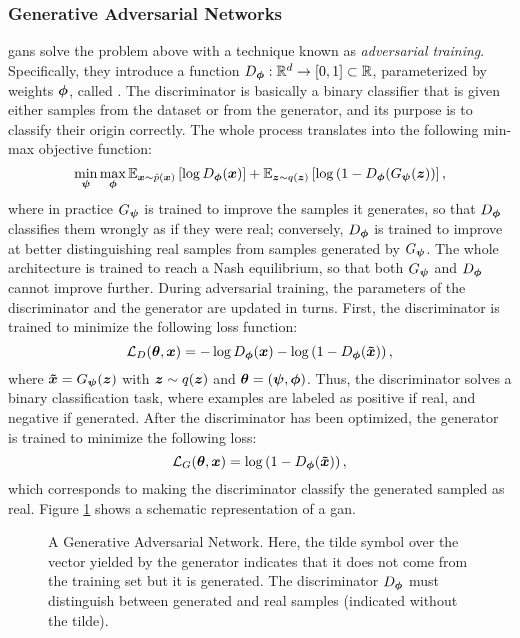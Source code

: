 \subsubsection*{Generative Adversarial Networks}
\glspl{gan} \citep{goodfellow2014gan} solve the problem above with a technique known as \emph{adversarial training}. Specifically, they introduce a function $D_{\boldsymbol{\phi}}: \mathbb{R}^d \rightarrow [0,1] \subset \mathbb{R}$, parameterized by weights $\boldsymbol{\phi}$, called . The discriminator is basically a binary classifier that is given either samples from the dataset or from the generator, and its purpose is to classify their origin correctly. The whole process translates into the following min-max objective function:
$$\min_{\GenParam} \max_{\DiscParam} \Expectation{\Vector{x} \sim \hat{p}(\Vector{x})}{\log \Discriminator(\Vector{x})} + \Expectation{\Vector{z} \sim q(\Vector{z})}{\log\Par{1-\Discriminator(\Generator(\Vector{z})}},$$
where in practice $G_{\boldsymbol{\psi}}$ is trained to improve the samples it generates, so that $D_{\boldsymbol{\phi}}$ classifies them wrongly as if they were real; conversely, $D_{\boldsymbol{\phi}}$ is trained to improve at better distinguishing real samples from samples generated by $G_{\boldsymbol{\psi}}$. The whole architecture is trained to reach a Nash equilibrium, so that both $G_{\boldsymbol{\psi}}$ and $D_{\boldsymbol{\phi}}$ cannot improve further. During adversarial training, the parameters of the discriminator and the generator are updated in turns. First, the discriminator is trained to minimize the following loss function:
$$\Loss_D(\Param, \Vector{x}) =  -\log \Discriminator(\Vector{x}) -\log\Par{1-\Discriminator(\Vector{\tilde{x}})},$$
where $\Vector{\tilde{x}} = \Generator(\Vector{z})$ with $\Vector{z} \sim q(\Vector{z})$ and $\boldsymbol{\theta} = (\boldsymbol{\psi}, \boldsymbol{\phi})$. Thus, the discriminator solves a binary classification task, where examples are labeled as positive if real, and negative if generated. After the discriminator has been optimized, the generator is trained to minimize the following loss:
$$\Loss_G(\Param, \Vector{x}) = \log\Par{1-\Discriminator(\Vector{\tilde{x}})},$$
which corresponds to making the discriminator classify the generated sampled as real. Figure \ref{fig:gan} shows a schematic representation of a \gls{gan}.
\begin{figure*}[h!]
    \centering
    \resizebox{.65\textwidth}{!}{}
    \caption{A Generative Adversarial Network. Here, the tilde symbol over the vector yielded by the generator indicates that it does not come from the training set but it is generated. The discriminator $D_{\boldsymbol{\phi}}$ must distinguish between generated and real samples (indicated without the tilde).}
    \label{fig:gan}
\end{figure*}

